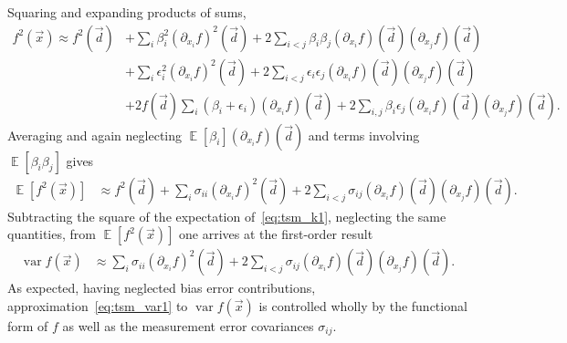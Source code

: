 \documentclass[letterpaper,11pt,nointlimits,reqno,draft]{amsbook}
\newcommand{\expect}[1]{\operatorname{\mathbb{E}}\left[#1\right]}
\begin{document}
Squaring and expanding products of sums,
\begin{align}
  f^2\left(\vec{x}\right) \approx f^2\left(\vec{d}\right)
 &+   \sum_i \beta_i^2
             \left(\partial_{x_i} f\right)^2\left(\vec{d}\right)
  +  2\sum_{i<j} \beta_i \beta_j
                 \left(\partial_{x_i} f\right)\left(\vec{d}\right)
                 \left(\partial_{x_j} f\right)\left(\vec{d}\right)
\\
 &+   \sum_i \epsilon_i^2  \left(\partial_{x_i} f\right)^2\left(\vec{d}\right)
  +  2\sum_{i<j} \epsilon_i \epsilon_j
                 \left(\partial_{x_i} f\right)\left(\vec{d}\right)
                 \left(\partial_{x_j} f\right)\left(\vec{d}\right)
\\
 &+ 2 f\left(\vec{d}\right) \sum_i
                            \left(\beta_i+\epsilon_i\right)
                            \left(\partial_{x_i} f\right)\left(\vec{d}\right)
  + 2 \sum_{i,j} \beta_i \epsilon_j
                 \left(\partial_{x_i} f\right)\left(\vec{d}\right)
                 \left(\partial_{x_j} f\right)\left(\vec{d}\right)
.
\end{align}
Averaging and again neglecting $\expect{\beta_i}\left(\partial_{x_i}
f\right)\left(\vec{d}\right)$ and terms involving $\expect{\beta_i \beta_j}$
gives
\begin{align}
  \expect{f^2\left(\vec{x}\right)}
&\approx
    f^2\left(\vec{d}\right)
  +  \sum_i \sigma_{ii}     \left(\partial_{x_i} f\right)^2\left(\vec{d}\right)
  + 2\sum_{i<j} \sigma_{ij} \left(\partial_{x_i} f\right)  \left(\vec{d}\right)
                            \left(\partial_{x_j} f\right)  \left(\vec{d}\right)
.
\end{align}
Subtracting the square of the expectation of~\eqref{eq:tsm_k1}, neglecting the
same quantities, from $\expect{f^2\left(\vec{x}\right)}$ one arrives at the
first-order result
\begin{align}
  \operatorname{var} f\left(\vec{x}\right)
&\approx
     \sum_i \sigma_{ii}     \left(\partial_{x_i} f\right)^2\left(\vec{d}\right)
  + 2\sum_{i<j} \sigma_{ij} \left(\partial_{x_i} f\right)  \left(\vec{d}\right)
                            \left(\partial_{x_j} f\right)  \left(\vec{d}\right)
\label{eq:tsm_var1}
.
\end{align}
As expected, having neglected bias error contributions,
approximation~\eqref{eq:tsm_var1} to $\operatorname{var} f\left(\vec{x}\right)$
is controlled wholly by the functional form of $f$ as well as the measurement
error covariances $\sigma_{ij}$.
\end{document}
